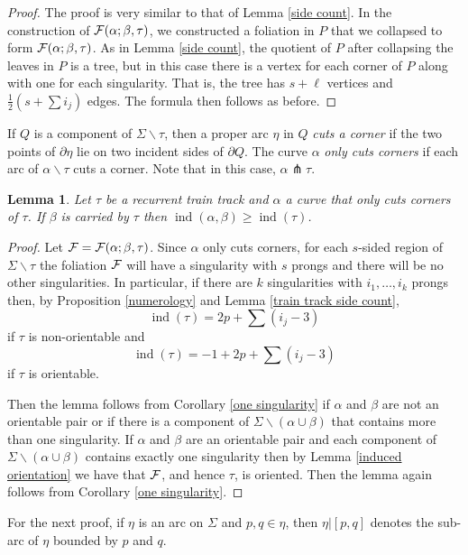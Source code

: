 \documentclass[11pt]{article}
\newtheorem{lemma}[thm]{Lemma}
\theoremstyle{remark}
\def\ind{\operatorname{ind}}
\newcommand{\cF}{{\cal F}}
\begin{document}
\begin{proof} The proof is very similar to that of Lemma \ref{side count}.
In the construction of $\cF(\alpha; \beta, \tau)$, we constructed a foliation in $P$ that we collapsed to form $\cF(\alpha; \beta, \tau)$.
As in Lemma \ref{side count}, the quotient of $P$ after collapsing the leaves in $P$ is
a tree, but in this
case there is a vertex for each corner of $P$ along with one for each singularity.
That is, the tree has $s + \ell$ vertices and $\frac12\left(s+ \sum i_j\right)$ edges. The formula then follows as before.
\end{proof}


If $Q$ is a component of $\Sigma \smallsetminus \tau$, then a proper arc $\eta$ in
$Q$ \emph{cuts a corner} if the two points of $\partial \eta$ lie on two incident
sides of
$\partial Q$. The curve $\alpha$  {\em only cuts corners} if each arc of
$\alpha \smallsetminus \tau$ cuts a corner. Note that in this case,
$\alpha \pitchfork \tau$.


\begin{lemma}
Let $\tau$ be a recurrent train track and $\alpha$ a curve that only cuts corners of $\tau$. If $\beta$ is carried by $\tau$ then $\ind(\alpha,\beta) \ge \ind(\tau)$.
\end{lemma}
\begin{proof}
Let $\cF = \cF(\alpha; \beta, \tau)$.
Since $\alpha$ only cuts corners, for each $s$-sided region of $\Sigma\smallsetminus\tau$ the foliation $\cF$ will have a singularity with $s$ prongs and there will be no other singularities. In particular, if there are $k$ singularities with $i_1, \dots, i_k$ prongs then, by Proposition \ref{numerology} and Lemma \ref{train track side count},
$$\ind(\tau) = 2p + \sum(i_j - 3)$$
if $\tau$ is non-orientable and
$$\ind(\tau) = -1 +2p + \sum(i_j - 3)$$
if $\tau$ is orientable.

Then the lemma follows from Corollary \ref{one singularity} if $\alpha$ and $\beta$ are not an orientable pair or if there is a component of $\Sigma\smallsetminus (\alpha\cup\beta)$ that contains more than one singularity. If $\alpha$ and $\beta$ are an orientable pair and each component of $\Sigma\smallsetminus (\alpha\cup\beta)$ contains exactly one singularity then by Lemma \ref{induced orientation} we have that $\cF$, and hence $\tau$, is oriented. Then the lemma again follows from Corollary \ref{one singularity}.
\end{proof}


For the next proof, if $\eta$ is an arc on $\Sigma$ and $p,q\in \eta$, then
$\eta|[p,q]$ denotes the sub-arc of $\eta$ bounded by $p$ and $q$.
\end{document}
